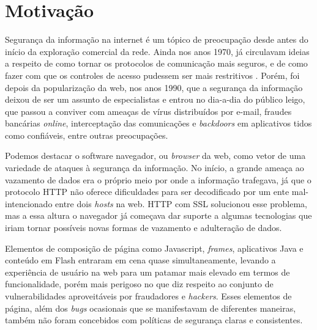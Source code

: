 \section{Motivação}


Segurança da informação na internet é um tópico de preocupação desde antes do início da exploração comercial da rede. Ainda nos anos 1970, já circulavam ideias a respeito de como tornar os protocolos de comunicação mais seguros, e de como fazer com que os controles de acesso pudessem ser mais restritivos \cite{WSP2015}. Porém, foi depois da popularização da web, nos anos 1990, que a segurança da informação deixou de ser um assunto de especialistas e entrou no dia-a-dia do público leigo, que passou a conviver com ameaças de vírus distribuídos por e-mail, fraudes bancárias \textit{online}, interceptação das comunicações e \textit{backdoors} em aplicativos tidos como confiáveis, entre outras preocupações.

Podemos destacar o software navegador, ou \textit{browser} da web, como vetor de uma variedade de ataques à segurança da informação. No início, a grande ameaça ao vazamento de dados era o próprio meio por onde a informação trafegava, já que o protocolo HTTP não oferece dificuldades para ser decodificado por um ente mal-intencionado entre dois \textit{hosts} na web. HTTP com SSL solucionou esse problema, mas a essa altura o navegador já começava dar suporte a algumas tecnologias que iriam tornar possíveis novas formas de vazamento e adulteração de dados.

Elementos de composição de página como Javascript, \textit{frames}, aplicativos Java e conteúdo em Flash entraram em cena quase simultaneamente, levando a experiência de usuário na web para um patamar mais elevado em termos de funcionalidade, porém mais perigoso no que diz respeito ao conjunto de vulnerabilidades aproveitáveis por fraudadores e \textit{hackers}. Esses elementos de página, além dos \textit{bugs} ocasionais que se manifestavam de diferentes maneiras, também não foram concebidos com políticas de segurança claras e consistentes.

